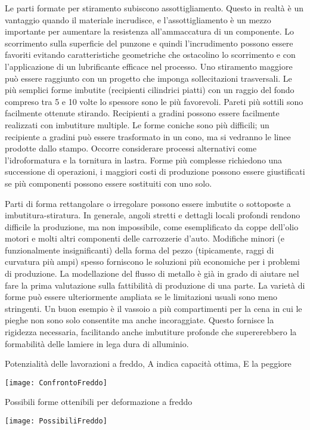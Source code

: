 Le parti formate per stiramento subiscono assottigliamento. Questo in realtà è un vantaggio
quando il materiale incrudisce, e l'assottigliamento è un mezzo importante per aumentare
la resistenza all'ammaccatura di un componente. Lo scorrimento sulla superficie del
punzone e quindi l'incrudimento possono essere favoriti evitando caratteristiche
geometriche che ostacolino lo scorrimento e con l'applicazione di un lubrificante efficace nel
processo. Uno stiramento maggiore può essere raggiunto con un progetto che imponga
sollecitazioni trasversali.
Le più semplici forme imbutite (recipienti cilindrici piatti) con un raggio del fondo compreso
tra 5 e 10 volte lo spessore sono le più favorevoli. Pareti più sottili sono facilmente ottenute
stirando. Recipienti a gradini possono essere facilmente realizzati con imbutiture multiple.
Le forme coniche sono più difficili; un recipiente a gradini può essere trasformato in un cono,
ma si vedranno le linee prodotte dallo stampo. Occorre considerare processi alternativi
come l'idroformatura e la tornitura in lastra. Forme più complesse richiedono una
successione di operazioni, i maggiori costi di produzione possono essere giustificati se più
componenti possono essere sostituiti con uno solo.

Parti di forma rettangolare o irregolare possono essere imbutite o sottoposte a imbutitura-stiratura. In generale, angoli stretti e dettagli locali profondi rendono difficile la produzione, ma non impossibile, come esemplificato da coppe dell'olio motori e molti altri componenti delle carrozzerie d'auto. Modifiche minori (e funzionalmente insignificanti) della forma del pezzo (tipicamente, raggi di curvatura più ampi) spesso forniscono le soluzioni più economiche per i problemi di produzione. La modellazione del flusso di metallo è già in grado di aiutare nel fare la prima valutazione sulla fattibilità di produzione di una parte.
La varietà di forme può essere ulteriormente ampliata se le limitazioni usuali sono meno stringenti. Un buon esempio è il vassoio a più compartimenti per la cena in cui le pieghe non sono solo consentite ma anche incoraggiate. Questo fornisce la rigidezza necessaria, facilitando anche imbutiture profonde che supererebbero la formabilità delle lamiere in lega dura di alluminio.

\begin{table}
\centering
\caption{Potenzialità delle lavorazioni a freddo, A indica capacità ottima, E la peggiore}
\label{tab:ConfrontoFreddo}
\texttt{[image: ConfrontoFreddo]}
\end{table}

\begin{table}
\centering
\caption{Possibili forme ottenibili per deformazione a freddo}\label{tab:PossibiliFreddo}
\texttt{[image: PossibiliFreddo]}
\end{table}

